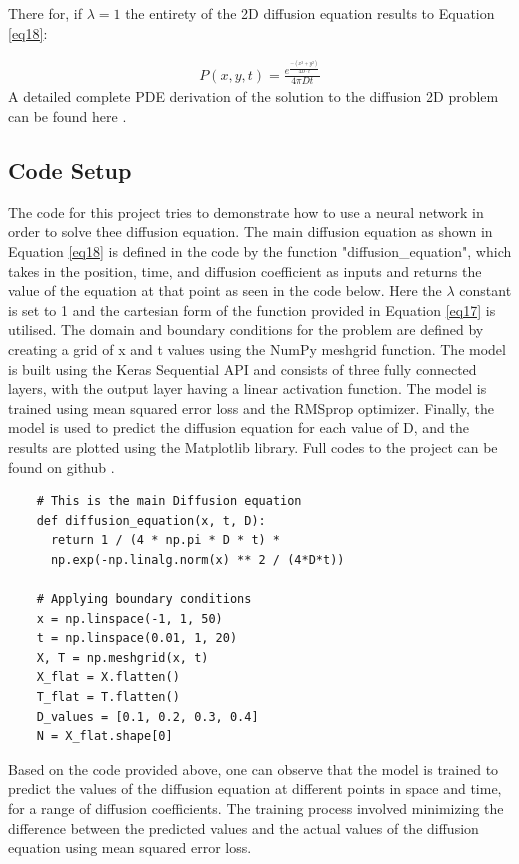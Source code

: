There for, if $\lambda = 1$ the entirety of the 2D diffusion equation results to Equation \eqref{eq18}: 

\begin{align*}
    \boxed{
    P(x,y,t) = \frac{e^{\frac{-(x^2 + y^2)}{4 D \cdot t}}}{4 \pi D t} \tag{18} }
    \label{eq18}  
\end{align*}
A detailed complete PDE derivation of the solution to the diffusion 2D problem can be found here \cite{Eyob2023}. 


\subsection{Code Setup}
The code for this project tries to demonstrate how to use a neural network in order to solve thee diffusion equation. The main diffusion equation as shown in Equation \eqref{eq18} is defined in the code by the function "diffusion\_equation", which takes in the position, time, and diffusion coefficient as inputs and returns the value of the equation at that point as seen in the code below. Here the $\lambda$ constant is set to 1 and the cartesian form of the function provided in Equation \eqref{eq17} is utilised. The domain and boundary conditions for the problem are defined by creating a grid of x and t values using the NumPy meshgrid function. The model is built using the Keras Sequential API and consists of three fully connected layers, with the output layer having a linear activation function. The model is trained using mean squared error loss and the RMSprop optimizer. Finally, the model is used to predict the diffusion equation for each value of D, and the results are plotted using the Matplotlib library. Full codes to the project can be found on github \cite{Eyob2023_Git}.

\begin{center}
   \begin{verbatim}
    # This is the main Diffusion equation
    def diffusion_equation(x, t, D):
      return 1 / (4 * np.pi * D * t) * 
      np.exp(-np.linalg.norm(x) ** 2 / (4*D*t))

    # Applying boundary conditions
    x = np.linspace(-1, 1, 50)
    t = np.linspace(0.01, 1, 20)
    X, T = np.meshgrid(x, t)
    X_flat = X.flatten()
    T_flat = T.flatten()
    D_values = [0.1, 0.2, 0.3, 0.4]
    N = X_flat.shape[0]
\end{verbatim} 
\end{center}


Based on the code provided above, one can observe that the model is trained to predict the values of the diffusion equation at different points in space and time, for a range of diffusion coefficients. The training process involved minimizing the difference between the predicted values and the actual values of the diffusion equation using mean squared error loss. 

